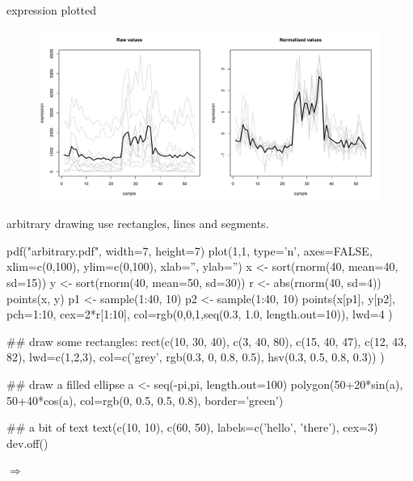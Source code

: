 \documentclass[pdf]{beamer}
\begin{document}
\begin{frame}{expression plotted}
  \begin{figure}[ht]
    \includegraphics[width=\textwidth]{images/expression}
  \end{figure}
\end{frame}

\begin{frame}[fragile]{arbitrary drawing}
  use rectangles, lines and segments.
  
  \begin{rcode}
    pdf("arbitrary.pdf", width=7, height=7)
    plot(1,1, type='n', axes=FALSE, xlim=c(0,100), ylim=c(0,100), xlab='', ylab='')
    x <- sort(rnorm(40, mean=40, sd=15))
    y <- sort(rnorm(40, mean=50, sd=30))
    r <- abs(rnorm(40, sd=4))
    points(x, y)
    p1 <- sample(1:40, 10)
    p2 <- sample(1:40, 10)
    points(x[p1], y[p2], pch=1:10, cex=2*r[1:10], 
           col=rgb(0,0,1,seq(0.3, 1.0, length.out=10)), lwd=4 )
    
    ## draw some rectangles:
    rect(c(10, 30, 40), c(3, 40, 80), c(15, 40, 47), c(12, 43, 82), lwd=c(1,2,3),
         col=c('grey', rgb(0.3, 0, 0.8, 0.5), hsv(0.3, 0.5, 0.8, 0.3)) )

    ## draw a filled ellipse
    a <- seq(-pi,pi, length.out=100)
    polygon(50+20*sin(a), 50+40*cos(a), col=rgb(0, 0.5, 0.5, 0.8), border='green') 
    
    ## a bit of text
    text(c(10, 10), c(60, 50), labels=c('hello', 'there'), cex=3)
    dev.off()
  \end{rcode}
  
  \huge $\Rightarrow$
\end{frame}
\end{document}
